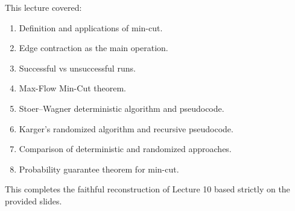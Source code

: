 \documentclass[12pt]{article}
\begin{document}
This lecture covered:

\begin{enumerate}
    \item Definition and applications of min-cut.
    \item Edge contraction as the main operation.
    \item Successful vs unsuccessful runs.
    \item Max-Flow Min-Cut theorem.
    \item Stoer–Wagner deterministic algorithm and pseudocode.
    \item Karger’s randomized algorithm and recursive pseudocode.
    \item Comparison of deterministic and randomized approaches.
    \item Probability guarantee theorem for min-cut.
\end{enumerate}

This completes the faithful reconstruction of Lecture 10 based strictly on the provided slides.
\end{document}
